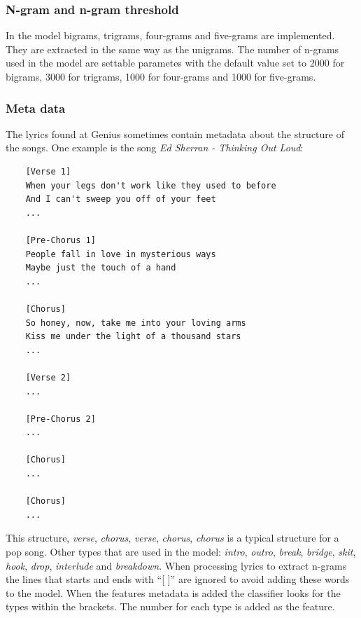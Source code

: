 \documentclass[a4paper, 12pt]{article}
\begin{document}
\subsubsection*{N-gram and n-gram threshold}
In the model bigrams, trigrams, four-grams and five-grams are implemented.
They are extracted in the same way as the unigrams.
The number of n-grams used in the model are settable parametes with the default value set to 2000 for bigrams, 3000 for trigrams, 1000 for four-grams and 1000 for five-grams.

\subsubsection*{Meta data}
The lyrics found at Genius sometimes contain metadata about the structure of the songs.
One example is the song \textit{Ed Sherran - Thinking Out Loud}: \cite{ed_thinking}

\begin{verbatim}
    [Verse 1]
    When your legs don't work like they used to before
    And I can't sweep you off of your feet
    ...

    [Pre-Chorus 1]
    People fall in love in mysterious ways
    Maybe just the touch of a hand
    ...

    [Chorus]
    So honey, now, take me into your loving arms
    Kiss me under the light of a thousand stars
    ...

    [Verse 2]
    ...

    [Pre-Chorus 2]
    ...

    [Chorus]
    ...

    [Chorus]
    ...

\end{verbatim}

This structure, \textit{verse}, \textit{chorus}, \textit{verse}, \textit{chorus}, \textit{chorus} is a typical structure for a pop song.
Other types that are used in the model: \textit{intro}, \textit{outro}, \textit{break}, \textit{bridge}, \textit{skit}, \textit{hook}, \textit{drop}, \textit{interlude} and \textit{breakdown}.
When processing lyrics to extract n-grams the lines that starts and ends with ``[ ]'' are ignored to avoid adding these words to the model.
When the features metadata is added the classifier looks for the types within the brackets.
The number for each type is added as the feature.
\end{document}
